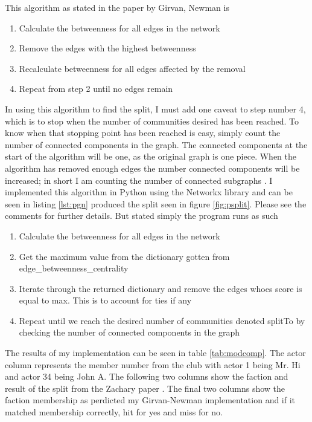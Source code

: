\documentclass[letterpaper,10pt]{article}
\begin{document}
This algorithm as stated in the paper by Girvan, Newman is 
\begin{enumerate}
\item Calculate the betweenness for all edges in the network
\item Remove the edges with the highest betweenness
\item Recalculate betweenness for all edges affected by the removal
\item Repeat from step 2 until no edges remain
\end{enumerate}


In using this algorithm to find the split, I must add one caveat to step number 4, which is to stop when the number of communities desired has been reached. To know when that stopping point has been reached is easy, simply count the number of connected components in the graph. The connected components at the start of the algorithm will be one, as the original graph is one piece. When the algorithm has removed enough edges the number connected components will be increased; in short I am counting the number of connected subgraphs
 \cite{gconnect}.
\newline
I implemented this algorithm in Python using the Networkx library and can be seen in listing \ref{lst:pgn} produced the split seen in figure \ref{fig:psplit}. Please see the comments for further details. 
But stated simply the program runs as such 
\begin{enumerate}
\item Calculate the betweenness for all edges in the network
\item Get the maximum value from the dictionary gotten from edge\_betweenness\_centrality
\item Iterate through the returned dictionary and remove the edges whoes score is equal to max. This is to account for ties if any
\item Repeat until we reach the desired number of communities denoted splitTo by checking the number of connected components in the graph
\end{enumerate}

The results of my implementation can be seen in table \ref{tab:modcomp}. The actor column represents the member number from the club with actor 1 being Mr. Hi and actor 34 being John A. The following two columns show the faction and result of the split from the Zachary paper \cite{zacharykclub}. The final two columns show the faction membership as perdicted my Girvan-Newman implementation and if it matched membership correctly, hit for yes and miss for no. 
\end{document}
